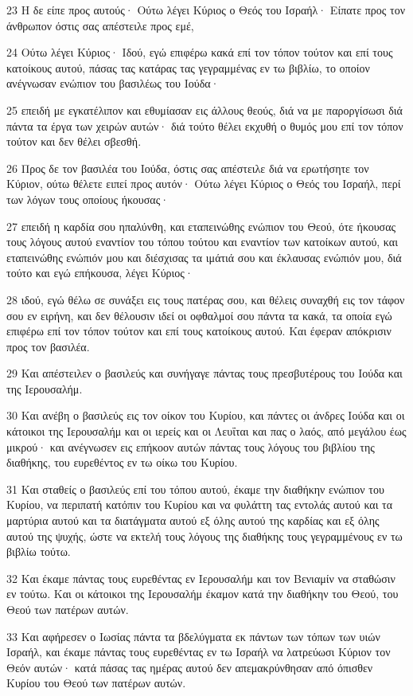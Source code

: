 \par 23 Η δε είπε προς αυτούς· Ούτω λέγει Κύριος ο Θεός του Ισραήλ· Είπατε προς τον άνθρωπον όστις σας απέστειλε προς εμέ,
\par 24 Ούτω λέγει Κύριος· Ιδού, εγώ επιφέρω κακά επί τον τόπον τούτον και επί τους κατοίκους αυτού, πάσας τας κατάρας τας γεγραμμένας εν τω βιβλίω, το οποίον ανέγνωσαν ενώπιον του βασιλέως του Ιούδα·
\par 25 επειδή με εγκατέλιπον και εθυμίασαν εις άλλους θεούς, διά να με παροργίσωσι διά πάντα τα έργα των χειρών αυτών· διά τούτο θέλει εκχυθή ο θυμός μου επί τον τόπον τούτον και δεν θέλει σβεσθή.
\par 26 Προς δε τον βασιλέα του Ιούδα, όστις σας απέστειλε διά να ερωτήσητε τον Κύριον, ούτω θέλετε ειπεί προς αυτόν· Ούτω λέγει Κύριος ο Θεός του Ισραήλ, περί των λόγων τους οποίους ήκουσας·
\par 27 επειδή η καρδία σου ηπαλύνθη, και εταπεινώθης ενώπιον του Θεού, ότε ήκουσας τους λόγους αυτού εναντίον του τόπου τούτου και εναντίον των κατοίκων αυτού, και εταπεινώθης ενώπιόν μου και διέσχισας τα ιμάτιά σου και έκλαυσας ενώπιόν μου, διά τούτο και εγώ επήκουσα, λέγει Κύριος·
\par 28 ιδού, εγώ θέλω σε συνάξει εις τους πατέρας σου, και θέλεις συναχθή εις τον τάφον σου εν ειρήνη, και δεν θέλουσιν ιδεί οι οφθαλμοί σου πάντα τα κακά, τα οποία εγώ επιφέρω επί τον τόπον τούτον και επί τους κατοίκους αυτού. Και έφεραν απόκρισιν προς τον βασιλέα.
\par 29 Και απέστειλεν ο βασιλεύς και συνήγαγε πάντας τους πρεσβυτέρους του Ιούδα και της Ιερουσαλήμ.
\par 30 Και ανέβη ο βασιλεύς εις τον οίκον του Κυρίου, και πάντες οι άνδρες Ιούδα και οι κάτοικοι της Ιερουσαλήμ και οι ιερείς και οι Λευΐται και πας ο λαός, από μεγάλου έως μικρού· και ανέγνωσεν εις επήκοον αυτών πάντας τους λόγους του βιβλίου της διαθήκης, του ευρεθέντος εν τω οίκω του Κυρίου.
\par 31 Και σταθείς ο βασιλεύς επί του τόπου αυτού, έκαμε την διαθήκην ενώπιον του Κυρίου, να περιπατή κατόπιν του Κυρίου και να φυλάττη τας εντολάς αυτού και τα μαρτύρια αυτού και τα διατάγματα αυτού εξ όλης αυτού της καρδίας και εξ όλης αυτού της ψυχής, ώστε να εκτελή τους λόγους της διαθήκης τους γεγραμμένους εν τω βιβλίω τούτω.
\par 32 Και έκαμε πάντας τους ευρεθέντας εν Ιερουσαλήμ και τον Βενιαμίν να σταθώσιν εν τούτω. Και οι κάτοικοι της Ιερουσαλήμ έκαμον κατά την διαθήκην του Θεού, του Θεού των πατέρων αυτών.
\par 33 Και αφήρεσεν ο Ιωσίας πάντα τα βδελύγματα εκ πάντων των τόπων των υιών Ισραήλ, και έκαμε πάντας τους ευρεθέντας εν τω Ισραήλ να λατρεύωσι Κύριον τον Θεόν αυτών· κατά πάσας τας ημέρας αυτού δεν απεμακρύνθησαν από όπισθεν Κυρίου του Θεού των πατέρων αυτών.

